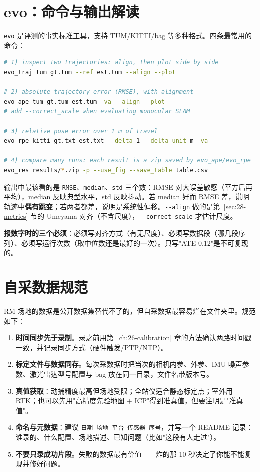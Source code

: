 \section{evo：命令与输出解读}\label{sec:28-evo}

\lstinline{evo} 是评测的事实标准工具，支持 TUM/KITTI/bag 等多种格式。四条最常用的命令：

\begin{lstlisting}[language=bash,caption={evo 常用命令},label={lst:28-evo}]
# 1) inspect two trajectories: align, then plot side by side
evo_traj tum gt.tum --ref est.tum --align --plot

# 2) absolute trajectory error (RMSE), with alignment
evo_ape tum gt.tum est.tum -va --align --plot
# add --correct_scale when evaluating monocular SLAM

# 3) relative pose error over 1 m of travel
evo_rpe kitti gt.txt est.txt --delta 1 --delta_unit m -va

# 4) compare many runs: each result is a zip saved by evo_ape/evo_rpe
evo_res results/*.zip -p --use_fig --save_table table.csv
\end{lstlisting}

输出中最该看的是 \lstinline{RMSE}、\lstinline{median}、\lstinline{std} 三个数：RMSE 对大误差敏感（平方后再平均），median 反映典型水平，std 反映抖动。若 median 好而 RMSE 差，说明轨迹中\textbf{偶有跳变}；若两者都差，说明是系统性偏移。\lstinline{--align} 做的是第~\ref{sec:28-metrics} 节的 Umeyama 对齐（不含尺度），\lstinline{--correct_scale} 才估计尺度。

\begin{note}
\textbf{报数字时的三个必须}：必须写对齐方式（有无尺度）、必须写数据段（哪几段序列）、必须写运行次数（取中位数还是最好的一次）。只写"ATE 0.12"是不可复现的。
\end{note}

\section{自采数据规范}\label{sec:28-selfdata}

RM 场地的数据是公开数据集替代不了的，但自采数据最容易烂在文件夹里。规范如下：

\begin{enumerate}
  \item \textbf{时间同步先于录制}。录之前用第~\ref{ch:26-calibration} 章的方法确认两路时间戳一致，并记录同步方式（硬件触发/PTP/NTP）。
  \item \textbf{标定文件与数据同存}。每次采数据时把当次的相机内参、外参、IMU 噪声参数、激光雷达型号配置与 bag 放在同一目录，文件名带版本号。
  \item \textbf{真值获取}：动捕精度最高但场地受限；全站仪适合静态标定点；室外用 RTK；也可以先用"高精度先验地图 + ICP"得到准真值，但要注明是"准真值"。
  \item \textbf{命名与元数据}：建议 \lstinline{日期_场地_平台_传感器_序号}，并写一个 README 记录：谁录的、什么配置、场地描述、已知问题（比如"这段有人走过"）。
  \item \textbf{不要只录成功片段}。失败的数据最有价值——炸的那 10 秒决定了你能不能复现并修好问题。
\end{enumerate}

